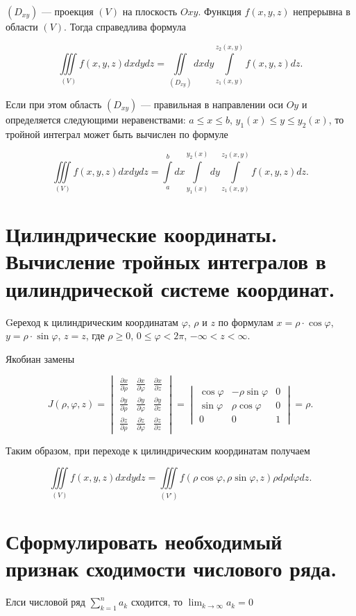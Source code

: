 \documentclass[16pt]{extarticle}
\begin{document}
$(D_{xy})$ --- проекция $(V)$ на плоскость $Oxy$. Функция $f(x, y, z)$ непрерывна в области $(V)$. Тогда справедлива формула

\[
\iiint\limits_{(V)} f(x, y, z) dxdydz = \iint\limits_{(D_{xy})} dxdy \int\limits_{z_1(x, y)}^{z_2(x, y)} f(x, y, z) dz.
\]

Если при этом область $(D_{xy})$ --- правильная в направлении оси $Oy$ и определяется следующими неравенствами: $a \leq x \leq b$, $y_1(x) \leq y \leq y_2(x)$, то тройной интеграл может быть вычислен по формуле

\[
\iiint\limits_{(V)} f(x, y, z) dxdydz = \int\limits_{a}^{b} dx \int\limits_{y_1(x)}^{y_2(x)} dy \int\limits_{z_1(x, y)}^{z_2(x, y)} f(x, y, z) dz.
\]
\section{Цилиндрические координаты. Вычисление тройных интегралов в цилиндрической системе координат.}
Gереход к цилиндрическим координатам $\varphi$, $\rho$ и $z$ по формулам $x = \rho \cdot \cos\varphi$, $y = \rho \cdot \sin\varphi$, $z = z$, где $\rho \geq 0$, $0 \leq \varphi < 2\pi$, $-\infty<z<\infty$.

Якобиан замены

\[
J(\rho, \varphi, z) =
\begin{vmatrix}
  \frac{\partial x}{\partial \rho} & \frac{\partial x}{\partial \varphi} & \frac{\partial x}{\partial z} \\
  \frac{\partial y}{\partial \rho} & \frac{\partial y}{\partial \varphi} & \frac{\partial y}{\partial z} \\
  \frac{\partial z}{\partial \rho} & \frac{\partial z}{\partial \varphi} & \frac{\partial z}{\partial z}
\end{vmatrix}
=
\begin{vmatrix}
  \cos \varphi & -\rho \sin \varphi & 0 \\
  \sin \varphi & \rho \cos \varphi & 0 \\
  0 & 0 & 1
\end{vmatrix}
= \rho.
\]

Таким образом, при переходе к цилиндрическим координатам получаем

\[
\iiint\limits_{(V)} f(x, y, z) dxdydz = \iiint\limits_{(V')} f(\rho \cos \varphi, \rho \sin \varphi, z) \rho d\rho d\varphi dz.
\]
\section{Сформулировать необходимый признак сходимости числового ряда.}
Елси числовой ряд $\sum_{k=1}^{n}a_k$ сходится, то $\lim_{k \to \infty} a_k = 0$
\end{document}
